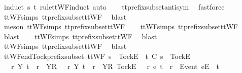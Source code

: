 \ {\isacharparenleft}induct\ s\ t\ rule{\isacharcolon}ttWF{}{\isachardot}induct{\isacharcomma}\ auto{\isacharparenright}\isanewline
\ \ \isamarkupfalse%
\ tt{\isacharunderscore}prefix{\isacharunderscore}subset{\isacharunderscore}antisym\ \isamarkupfalse%
\ fastforce\isanewline
\ \ \isamarkupfalse%
\ ttWF{\isachardot}simps{\isacharparenleft}{}{}{\isacharparenright}\ tt{\isacharunderscore}prefix{\isacharunderscore}subset{\isacharunderscore}ttWF\ \isamarkupfalse%
\ blast\isanewline
\ \ \isamarkupfalse%
\ {\isacharparenleft}meson\ ttWF{\isachardot}simps{\isacharparenleft}{}{}{\isacharparenright}\ tt{\isacharunderscore}prefix{\isacharunderscore}subset{\isacharunderscore}ttWF{\isacharparenright}\isanewline
\ \ \isamarkupfalse%
\ ttWF{\isachardot}simps{\isacharparenleft}{}{}{\isacharparenright}\ tt{\isacharunderscore}prefix{\isacharunderscore}subset{\isacharunderscore}ttWF\ \isamarkupfalse%
\ blast\isanewline
\ \ \isamarkupfalse%
\ ttWF{\isachardot}simps{\isacharparenleft}{}{\isacharparenright}\ tt{\isacharunderscore}prefix{\isacharunderscore}subset{\isacharunderscore}ttWF\ \isamarkupfalse%
\ blast\isanewline
\ \ \isamarkupfalse%
\ ttWF{\isachardot}simps{\isacharparenleft}{}{\isacharparenright}\ tt{\isacharunderscore}prefix{\isacharunderscore}subset{\isacharunderscore}ttWF\ \isamarkupfalse%
\ blast%
\endisatagproof
{\isafoldproof}%
%
\isadelimproof
\isanewline
%
\endisadelimproof
\isanewline
{}\isamarkupfalse%
\ ttWF{\isacharunderscore}end{\isacharunderscore}Tock{\isacharunderscore}prefix{\isacharunderscore}subset{\isacharcolon}\ {\isachardoublequoteopen}ttWF\ {\isacharparenleft}s\ {\isacharat}\ {\isacharbrackleft}{\isacharbrackleft}Tock{\isacharbrackright}\isactrlsub E{\isacharbrackright}{\isacharparenright}\ {\isasymLongrightarrow}\ t\ {\isasymlesssim}\isactrlsub C\ s\ {\isacharat}\ {\isacharbrackleft}{\isacharbrackleft}Tock{\isacharbrackright}\isactrlsub E{\isacharbrackright}\ {\isasymLongrightarrow}\ \isanewline
\ \ {\isacharparenleft}{\isasymexists}\ r\ Y{\isachardot}\ t\ {\isacharequal}\ r\ {\isacharat}\ {\isacharbrackleft}{\isacharbrackleft}Y{\isacharbrackright}\isactrlsub R{\isacharbrackright}{\isacharparenright}\ {\isasymor}\ {\isacharparenleft}{\isasymexists}\ r\ Y{\isachardot}\ t\ {\isacharequal}\ r\ {\isacharat}\ {\isacharbrackleft}{\isacharbrackleft}Y{\isacharbrackright}\isactrlsub R{\isacharcomma}\ {\isacharbrackleft}Tock{\isacharbrackright}\isactrlsub E{\isacharbrackright}{\isacharparenright}\ {\isasymor}\ {\isacharparenleft}{\isasymexists}\ r\ e{\isachardot}\ t\ {\isacharequal}\ r\ {\isacharat}\ {\isacharbrackleft}{\isacharbrackleft}Event\ e{\isacharbrackright}\isactrlsub E{\isacharbrackright}{\isacharparenright}\ {\isasymor}\ t\ {\isacharequal}\ {\isacharbrackleft}{\isacharbrackright}{\isachardoublequoteclose}\isanewline
